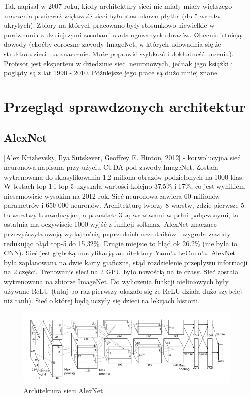 \documentclass[a4paper,twoside,titlepage,openright]{book}
\begin{document}
Tak napisał w 2007 roku, kiedy architektury sieci nie miały miały większego znaczenia ponieważ większość sieci była stosunkowo płytka (do 5 warstw ukrytych). Zbiory na których pracowano były stosunkowo niewielkie w porównaniu z dzisiejszymi zasobami skatalogowanych obrazów. 
Obecnie istnieją dowody (choćby coroczne zawody ImageNet, w których udowadnia się że struktura sieci ma znaczenie. Może poprawić szybkość i dokładność uczenia). Profesor jest ekspertem w dziedzinie sieci neuronowych, jednak jego książki i poglądy są z lat 1990 - 2010. Późniejsze jego prace są dużo mniej znane.

\section{Przegląd sprawdzonych architektur}
\subsection{AlexNet}
 [Alex Krizhevsky, Ilya Sutskever, Geoffrey E. Hinton, 2012] - konwolucyjna sieć neuronowa napisana przy użyciu CUDA pod zawody ImageNet. Została wytrenowana do sklasyfikowania 1,2 miliona obrazów podzielonych na 1000 klas. W testach top-1 i top-5 uzyskała wartości kolejno 37,5\% i 17\%, co jest wynikiem niesamowicie wysokim na 2012 rok. Sieć neuronowa zawiera 60 milionów parametrów i 650 000 neuronów.
Architekturę tworzy 8 warstw, gdzie pierwsze 5 to warstwy konwolucyjne, a pozostałe 3 są warstwami w pełni połączonymi, ta ostatnia ma oczywiście 1000 wyjść z funkcji softmax.
AlexNet znacząco przewyższyła swoją wydajnością poprzednich uczestników i wygrała zawody redukując błąd top-5 do 15,32\%. Drugie miejsce to błąd ok 26.2\% (nie była to CNN).
Sieć jest głęboką modyfikacją architektury Yann’a LeCunn’a. AlexNet była zaplanowana na dwie karty graficzne, stąd rozdzielenie przepływu informacji na 2 części. Trenowanie sieci na 2 GPU było nowością na te czasy. Sieć została wytrenowana na zbiorze ImageNet. Do wyliczenia funkcji nieliniowych były używane ReLU (tutaj po raz pierwszy okazało się że ReLU działa dużo szybciej niż tanh). Sieć o której będą uczyły się dzieci na lekcjach historii.

\begin{figure}[h]
	\centering
			\includegraphics[resolution=120]{AlexNet.png}
		\caption{Architektura sieci AlexNet}
\end{figure}
\end{document}
